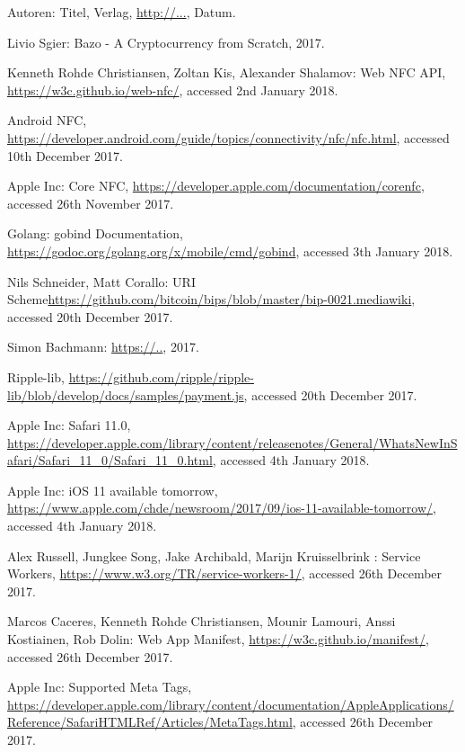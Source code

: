 \begin{thebibliography}{99}

 Autoren: Titel, Verlag, \url{http://...}, Datum.

 Livio Sgier: Bazo - A Cryptocurrency from Scratch, 2017.

 Kenneth Rohde Christiansen, Zoltan Kis, Alexander Shalamov: Web NFC API, \url{https://w3c.github.io/web-nfc/}, accessed 2nd January 2018.


 Android NFC, \url{https://developer.android.com/guide/topics/connectivity/nfc/nfc.html}, accessed 10th December 2017.

 Apple Inc: Core NFC, \url{https://developer.apple.com/documentation/corenfc}, accessed 26th November 2017.

 Golang: gobind Documentation, \url{https://godoc.org/golang.org/x/mobile/cmd/gobind}, accessed 3th January 2018.

 Nils Schneider, Matt Corallo: URI Scheme\url{https://github.com/bitcoin/bips/blob/master/bip-0021.mediawiki}, accessed 20th December 2017.

 Simon Bachmann:  \url{https://..}, 2017.

 Ripple-lib, \url{https://github.com/ripple/ripple-lib/blob/develop/docs/samples/payment.js}, accessed 20th December 2017.

 Apple Inc: Safari 11.0,   \url{https://developer.apple.com/library/content/releasenotes/General/WhatsNewInSafari/Safari_11_0/Safari_11_0.html}, accessed 4th January 2018.

 Apple Inc: iOS 11 available tomorrow,  \url{https://www.apple.com/chde/newsroom/2017/09/ios-11-available-tomorrow/}, accessed 4th January 2018.

 Alex Russell, Jungkee Song, Jake Archibald, Marijn Kruisselbrink : Service Workers, \url{https://www.w3.org/TR/service-workers-1/}, accessed 26th December 2017.

 Marcos Caceres, 
Kenneth Rohde Christiansen, Mounir Lamouri, Anssi Kostiainen, Rob Dolin: Web App Manifest, \url{https://w3c.github.io/manifest/}, accessed 26th December 2017.

 Apple Inc: Supported Meta Tags,  \url{https://developer.apple.com/library/content/documentation/AppleApplications/Reference/SafariHTMLRef/Articles/MetaTags.html}, accessed 26th December 2017.


\end{thebibliography}
